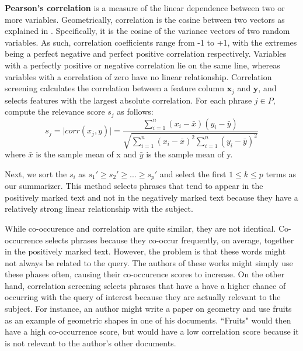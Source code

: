 \documentclass{article}
\begin{document}
\textbf{Pearson's correlation} is a measure of the linear dependence between two or more variables. Geometrically, correlation is the cosine between two vectors as explained in \cite{cosine}. Specifically, it is the cosine of the variance vectors of two random variables. As such, correlation coefficients range from -1 to +1, with the extremes being a perfect negative and perfect positive correlation respectively. Variables with a perfectly positive or negative correlation lie on the same line, whereas variables with a correlation of zero have no linear relationship. Correlation screening calculates the correlation between a feature column $\boldsymbol{x}_j$ and $\boldsymbol{y}$, and selects features with the largest absolute correlation. For each phrase $j \in P$, compute the relevance score $s_j$ as follows:\\
\begin{equation}
s_j = \vert corr(x_j , y) \vert = \frac{\sum_{i=1}^n(x_i-\bar{x})(y_i-\bar{y})}{\sqrt{\sum_{i=1}^n(x_i-\bar{x})^2\sum_{i=1}^n(y_i-\bar{y})^2}}
\end{equation}
where $\bar{x}$ is the sample mean of x and $\bar{y}$ is the sample mean of y.
\par
Next, we sort the $s_{i}$ as $s_1' \ge s_2' \ge ... \ge  s_p'$ and select the first $1 \leq k \leq p$ terms as our summarizer. This method selects phrases that tend to appear in the positively marked text and not in the negatively marked text because they have a relatively strong linear relationship with the subject.

While co-occurence and correlation are quite similar, they are not identical. Co-occurrence selects phrases because they co-occur frequently, on average, together in the positively marked text. However, the problem is that these words might not always be related to the query. The authors of these works might simply use these phases often, causing their co-occurence scores to increase. On the other hand, correlation screening selects phrases that have a have a higher chance of occurring with the query of interest because they are actually relevant to the subject. For instance, an author might write a paper on geometry and use fruits as an example of geometric shapes in one of his documents. ``Fruits" would then have a high co-occurrence score, but would have a low correlation score because it is not relevant to the author's other documents.
\end{document}
